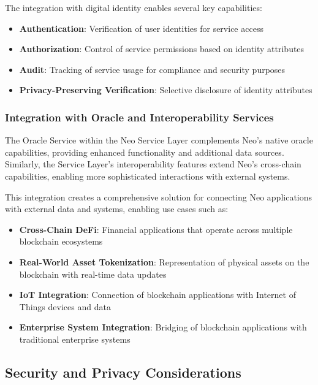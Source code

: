 \documentclass{article}
\begin{document}
The integration with digital identity enables several key capabilities:

\begin{itemize}
    \item \textbf{Authentication}: Verification of user identities for service access
    \item \textbf{Authorization}: Control of service permissions based on identity attributes
    \item \textbf{Audit}: Tracking of service usage for compliance and security purposes
    \item \textbf{Privacy-Preserving Verification}: Selective disclosure of identity attributes
\end{itemize}

\subsubsection{Integration with Oracle and Interoperability Services}
\label{subsubsec:oracle-interop-integration}

The Oracle Service within the Neo Service Layer complements Neo's native oracle capabilities, providing enhanced functionality and additional data sources. Similarly, the Service Layer's interoperability features extend Neo's cross-chain capabilities, enabling more sophisticated interactions with external systems.

This integration creates a comprehensive solution for connecting Neo applications with external data and systems, enabling use cases such as:

\begin{itemize}
    \item \textbf{Cross-Chain DeFi}: Financial applications that operate across multiple blockchain ecosystems
    \item \textbf{Real-World Asset Tokenization}: Representation of physical assets on the blockchain with real-time data updates
    \item \textbf{IoT Integration}: Connection of blockchain applications with Internet of Things devices and data
    \item \textbf{Enterprise System Integration}: Bridging of blockchain applications with traditional enterprise systems
\end{itemize}

\subsection{Security and Privacy Considerations}
\label{subsec:nsl-security}
\end{document}

